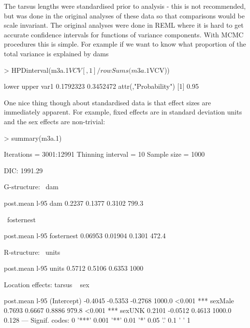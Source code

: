 \documentclass{article}
\begin{document}
The tarsus lengths were standardised prior to analysis - this is not recommended, but was done in the original analyses of these data \citep{Hadfield.2007} so that comparisons would be scale invariant. The original analyses were done in REML where it is hard to get accurate confidence intervals for functions of variance components.  With MCMC procedures this is simple. For example if we want to know what proportion of the total variance is explained by dams 

\begin{Schunk}
\begin{Sinput}
> HPDinterval(m3a.1$VCV[, 1]/rowSums(m3a.1$VCV))
\end{Sinput}
\begin{Soutput}
         lower     upper
var1 0.1792323 0.3452472
attr(,"Probability")
[1] 0.95
\end{Soutput}
\end{Schunk}

One nice thing though about standardised data is that effect sizes are immediately apparent. For example, fixed effects are in standard deviation units and the sex effects are non-trivial:

\begin{Schunk}
\begin{Sinput}
> summary(m3a.1)
\end{Sinput}
\begin{Soutput}
 Iterations = 3001:12991
 Thinning interval  = 10
 Sample size  = 1000 

 DIC: 1991.29 

 G-structure:  ~dam

    post.mean l-95%
dam    0.2237   0.1377   0.3102    799.3

               ~fosternest

           post.mean l-95%
fosternest   0.06953  0.01904   0.1301    472.4

 R-structure:  ~units

      post.mean l-95%
units    0.5712   0.5106   0.6353     1000

 Location effects: tarsus ~ sex 

            post.mean l-95%
(Intercept)   -0.4045  -0.5353  -0.2768   1000.0 <0.001 ***
sexMale        0.7693   0.6667   0.8886    979.8 <0.001 ***
sexUNK         0.2101  -0.0512   0.4613   1000.0  0.128    
---
Signif. codes:  
0 '***' 0.001 '**' 0.01 '*' 0.05 '.' 0.1 ' ' 1
\end{Soutput}
\end{Schunk}
\end{document}
